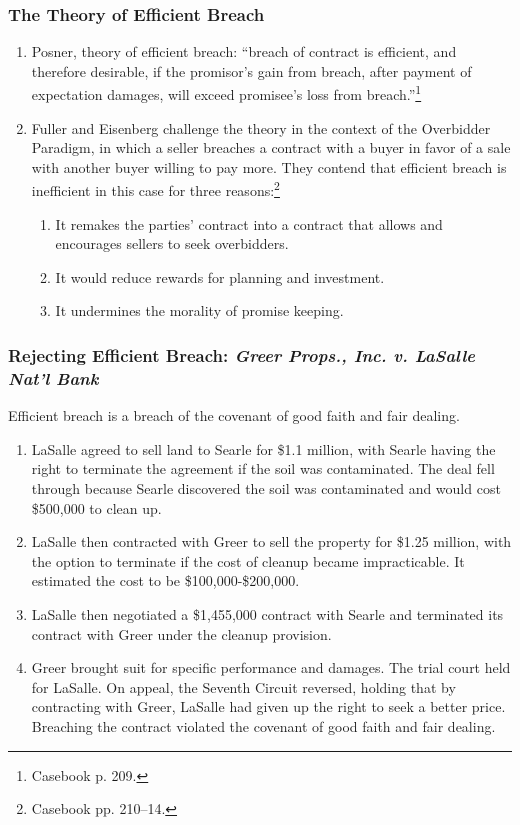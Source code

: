 \subsubsection{The Theory of Efficient Breach}

\begin{enumerate}
    \item Posner, theory of efficient breach: ``breach of contract is efficient, and 
    therefore desirable, if the promisor's gain from breach, after payment of 
    expectation damages, will exceed promisee's loss from 
    breach.''\footnote{Casebook p. 209.}
    \item Fuller and Eisenberg challenge the theory in the context of the 
    Overbidder Paradigm, in which a seller breaches a contract with a buyer in 
    favor of a sale with another buyer willing to pay more. They contend that 
    efficient breach is inefficient in this case for three 
    reasons:\footnote{Casebook pp. 210--14.}
    \begin{enumerate}
        \item It remakes the parties' contract into a contract that allows and 
        encourages sellers to seek overbidders.
        \item It would reduce rewards for planning and investment.
        \item It undermines the morality of promise keeping.
    \end{enumerate}
\end{enumerate}

\subsubsection{Rejecting Efficient Breach: \emph{Greer Props., Inc. v. LaSalle 
Nat'l Bank}}

Efficient breach is a breach of the covenant of good faith and fair dealing.

\begin{enumerate}
    \item LaSalle agreed to sell land to Searle for \$1.1 million, with Searle 
    having the right to terminate the agreement if the soil was contaminated. 
    The deal fell through because Searle discovered the soil was contaminated 
    and would cost \$500,000 to clean up.
    \item LaSalle then contracted with Greer to sell the property for \$1.25 
    million, with the option to terminate if the cost of cleanup became 
    impracticable. It estimated the cost to be \$100,000-\$200,000.
    \item LaSalle then negotiated a \$1,455,000 contract with Searle and 
    terminated its contract with Greer under the cleanup provision.
    \item Greer brought suit for specific performance and damages. The trial 
    court held for LaSalle. On appeal, the Seventh Circuit reversed, holding 
    that by contracting with Greer, LaSalle had given up the right to seek a 
    better price. Breaching the contract violated the covenant of good faith 
    and fair dealing.
\end{enumerate}

